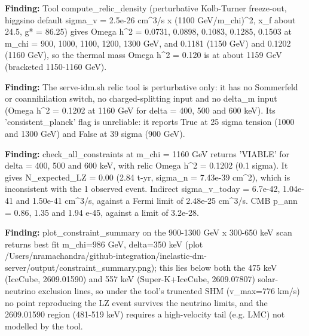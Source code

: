\documentclass[11pt,a4paper]{article}
\begin{document}
\textbf{Finding:} Tool compute\_relic\_density (perturbative Kolb-Turner freeze-out, higgsino default sigma\_v = 2.5e-26 cm\textasciicircum{}3/s x (1100 GeV/m\_chi)\textasciicircum{}2, x\_f about 24.5, g* = 86.25) gives Omega h\textasciicircum{}2 = 0.0731, 0.0898, 0.1083, 0.1285, 0.1503 at m\_chi = 900, 1000, 1100, 1200, 1300 GeV, and 0.1181 (1150 GeV) and 0.1202 (1160 GeV), so the thermal mass Omega h\textasciicircum{}2 = 0.120 is at about 1159 GeV (bracketed 1150-1160 GeV).

\textbf{Finding:} The serve-idm.sh relic tool is perturbative only: it has no Sommerfeld or coannihilation switch, no charged-splitting input and no delta\_m input (Omega h\textasciicircum{}2 = 0.1202 at 1160 GeV for delta = 400, 500 and 600 keV). Its 'consistent\_planck' flag is unreliable: it reports True at 25 sigma tension (1000 and 1300 GeV) and False at 39 sigma (900 GeV).

\textbf{Finding:} check\_all\_constraints at m\_chi = 1160 GeV returns 'VIABLE' for delta = 400, 500 and 600 keV, with relic Omega h\textasciicircum{}2 = 0.1202 (0.1 sigma). It gives N\_expected\_LZ = 0.00 (2.84 t-yr, sigma\_n = 7.43e-39 cm\textasciicircum{}2), which is inconsistent with the 1 observed event. Indirect sigma\_v\_today = 6.7e-42, 1.04e-41 and 1.50e-41 cm\textasciicircum{}3/s, against a Fermi limit of 2.48e-25 cm\textasciicircum{}3/s. CMB p\_ann = 0.86, 1.35 and 1.94 e-45, against a limit of 3.2e-28.

\textbf{Finding:} plot\_constraint\_summary on the 900-1300 GeV x 300-650 keV scan returns best fit m\_chi=986 GeV, delta=350 keV (plot /Users/nramachandra/github-integration/inelastic-dm-server/output/constraint\_summary.png); this lies below both the 475 keV (IceCube, 2609.01590) and 557 keV (Super-K+IceCube, 2609.07807) solar-neutrino exclusion lines, so under the tool's truncated SHM (v\_max=776 km/s) no point reproducing the LZ event survives the neutrino limits, and the 2609.01590 region (481-519 keV) requires a high-velocity tail (e.g. LMC) not modelled by the tool.
\end{document}
